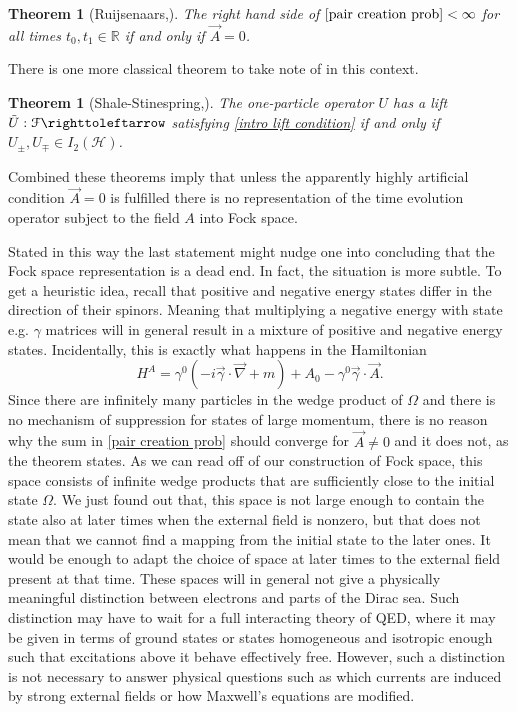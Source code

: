 \documentclass[b5paper,draft,openbib,12pt]{memoir}
\newtheorem{Thm}[Def]{Theorem}
\begin{document}
\begin{Thm}[Ruijsenaars,\cite{ruijsenaars1977charged}]\label{thm ruisnaar}
The right hand side of \(\eqref{pair creation prob}<\infty\)
for all times \(t_0,t_1\in\mathbb{R}\)
if and only if \(\vec{A}=0\).
\end{Thm}

There is one more classical theorem to take note of in this context.

\begin{Thm}[Shale-Stinespring,\cite{shale1965spinor}]\label{thm shale stinepsirng}
The one-particle operator \(U\) has a lift 
\(\tilde{U}:\mathcal{F}\righttoleftarrow\) satisfying 
\eqref{intro lift condition} if and only if 
\(U_{\pm}, U_{\mp}\in I_2(\mathcal{H})\). 
\end{Thm}

Combined these theorems imply that unless the apparently
highly artificial condition \(\vec{A}=0\) is 
fulfilled there is no representation of the time evolution 
operator subject to the field \(A\) into Fock space. 

Stated in this way the last statement might nudge one
into concluding that the Fock space representation 
is a dead end. In fact, the situation is more subtle. 
To get a heuristic idea, recall that positive and negative 
energy states differ in the direction of their spinors. 
Meaning that multiplying a negative energy  with state
e.g. \(\gamma\) matrices will in general result in 
a mixture of positive and negative energy states. 
Incidentally, this is exactly what happens in the Hamiltonian 
\begin{equation}
H^A=\gamma^0(-i\vec{\gamma}\cdot \vec{\nabla} +m) + A_0 -\gamma^0\vec{\gamma}\cdot\vec{A}.
\end{equation}
Since there are infinitely many particles in the wedge 
product of \(\Omega\) and there is no mechanism of suppression 
for states of large momentum, there is no reason why the sum in 
\eqref{pair creation prob} should converge for \(\vec{A}\neq 0\)
and it does not, as the theorem states. 
As we can read off of our construction of Fock space, this space 
consists of infinite wedge products that are sufficiently close 
to the initial state \(\Omega\). We just found out that, 
this space is not large enough to contain the state also at 
later times when the external field is nonzero, but that does 
not mean that we cannot find a mapping from the initial state 
to the later ones. It would be enough to adapt the choice of 
space at later times to the external field present at that time. 
These spaces will in general not give a physically meaningful 
distinction between electrons and parts of the Dirac sea. 
Such distinction may have to wait 
for a full interacting theory of QED, where it may be given 
in terms of ground states or states homogeneous and isotropic 
enough such that excitations above it behave effectively free. 
However, such a distinction is not necessary to answer 
physical questions such as which currents are 
induced by strong external fields or how Maxwell's 
equations are modified.  
\end{document}
